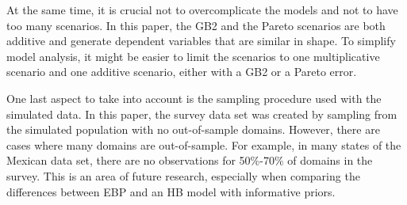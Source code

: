 At the same time, it is crucial not to overcomplicate the models and not to have too many scenarios.
In this paper, the GB2 and the Pareto scenarios are both additive and generate dependent variables that are similar in shape.
To simplify model analysis, it might be easier to limit the scenarios to one multiplicative scenario and one additive scenario, either with a GB2 or a Pareto error.

One last aspect to take into account is the sampling procedure used with the simulated data.
In this paper, the survey data set was created by sampling from the simulated population with no out-of-sample domains.
However, there are cases where many domains are out-of-sample.
For example, in many states of the Mexican data set, there are no observations for 50\%-70\% of domains in the survey.
This is an area of future research, especially when comparing the differences between EBP and an HB model with informative priors.


